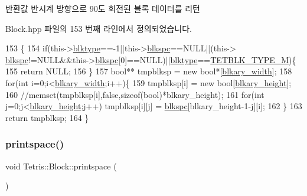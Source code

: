 \begin{DoxyReturn}{반환값}
반시계 방향으로 90도 회전된 블록 데이터를 리턴 
\end{DoxyReturn}


Block.\+hpp 파일의 153 번째 라인에서 정의되었습니다.


\begin{DoxyCode}
153                                         \{
154                 \textcolor{keywordflow}{if}(this->\hyperlink{class_tetris_1_1_block_aceac58dcf8d8afaa82c2bab101cb3cff}{blktype}==-1||this->\hyperlink{class_tetris_1_1_block_af2f96c83a3511d32321672f794aa4db1}{blkspc}==NULL||(this->
      \hyperlink{class_tetris_1_1_block_af2f96c83a3511d32321672f794aa4db1}{blkspc}!=NULL&&this->\hyperlink{class_tetris_1_1_block_af2f96c83a3511d32321672f794aa4db1}{blkspc}[0]==NULL)||\hyperlink{class_tetris_1_1_block_aceac58dcf8d8afaa82c2bab101cb3cff}{blktype}==\hyperlink{_block_8hpp_a6da1e2b8848e1a7b5a7ee687fd6492bd}{TETBLK\_TYPE\_M})\{
155                     \textcolor{keywordflow}{return} NULL;
156                 \}
157                 \textcolor{keywordtype}{bool}** tmpblksp = \textcolor{keyword}{new} \textcolor{keywordtype}{bool}*[\hyperlink{class_tetris_1_1_block_a96548cab58eb788af744b54192c7bea1}{blkary\_width}];
158                 \textcolor{keywordflow}{for}(\textcolor{keywordtype}{int} i=0;i<\hyperlink{class_tetris_1_1_block_a96548cab58eb788af744b54192c7bea1}{blkary\_width};i++)\{
159                     tmpblksp[i] = \textcolor{keyword}{new} \textcolor{keywordtype}{bool}[\hyperlink{class_tetris_1_1_block_abbea7737c2b1fb7339aab4dff13de27c}{blkary\_height}];
160                     \textcolor{comment}{//memset(tmpblksp[i],false,sizeof(bool)*blkary\_height);}
161                     \textcolor{keywordflow}{for}(\textcolor{keywordtype}{int} j=0;j<\hyperlink{class_tetris_1_1_block_abbea7737c2b1fb7339aab4dff13de27c}{blkary\_height};j++) tmpblksp[i][j] = 
      \hyperlink{class_tetris_1_1_block_af2f96c83a3511d32321672f794aa4db1}{blkspc}[blkary\_height-1-j][i];
162                 \}
163                 \textcolor{keywordflow}{return} tmpblksp;
164             \}
\end{DoxyCode}
\mbox{\label{class_tetris_1_1_block_ae7aadeec449fec232e9635d839593028}} 
\subsubsection{\texorpdfstring{printspace()}{printspace()}\hspace{0.1cm}{\footnotesize\ttfamily [1/2]}}
{\footnotesize\ttfamily void Tetris\+::\+Block\+::printspace (\begin{DoxyParamCaption}{ }\end{DoxyParamCaption})}



